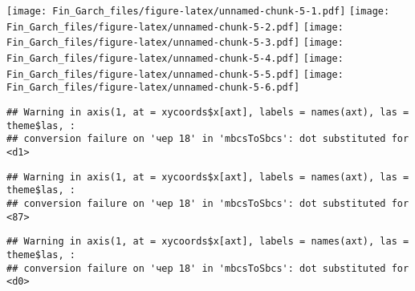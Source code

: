 \documentclass[]{article}
\newenvironment{Shaded}{\begin{snugshade}}{\end{snugshade}}
\newcommand{\DataTypeTok}[1]{\textcolor[rgb]{0.13,0.29,0.53}{#1}}
\newcommand{\DecValTok}[1]{\textcolor[rgb]{0.00,0.00,0.81}{#1}}
\newcommand{\KeywordTok}[1]{\textcolor[rgb]{0.13,0.29,0.53}{\textbf{#1}}}
\newcommand{\NormalTok}[1]{#1}
\newcommand{\OperatorTok}[1]{\textcolor[rgb]{0.81,0.36,0.00}{\textbf{#1}}}
\newcommand{\StringTok}[1]{\textcolor[rgb]{0.31,0.60,0.02}{#1}}
\begin{document}
\texttt{[image: Fin\_Garch\_files/figure-latex/unnamed-chunk-5-1.pdf]}
\texttt{[image: Fin\_Garch\_files/figure-latex/unnamed-chunk-5-2.pdf]}
\texttt{[image: Fin\_Garch\_files/figure-latex/unnamed-chunk-5-3.pdf]}
\texttt{[image: Fin\_Garch\_files/figure-latex/unnamed-chunk-5-4.pdf]}
\texttt{[image: Fin\_Garch\_files/figure-latex/unnamed-chunk-5-5.pdf]}
\texttt{[image: Fin\_Garch\_files/figure-latex/unnamed-chunk-5-6.pdf]}

\begin{Shaded}
\end{Shaded}

\begin{Shaded}
\end{Shaded}

\begin{verbatim}
## Warning in axis(1, at = xycoords$x[axt], labels = names(axt), las = theme$las, :
## conversion failure on 'чер 18' in 'mbcsToSbcs': dot substituted for <d1>
\end{verbatim}

\begin{verbatim}
## Warning in axis(1, at = xycoords$x[axt], labels = names(axt), las = theme$las, :
## conversion failure on 'чер 18' in 'mbcsToSbcs': dot substituted for <87>
\end{verbatim}

\begin{verbatim}
## Warning in axis(1, at = xycoords$x[axt], labels = names(axt), las = theme$las, :
## conversion failure on 'чер 18' in 'mbcsToSbcs': dot substituted for <d0>
\end{verbatim}
\end{document}
